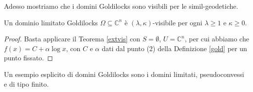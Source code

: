 Adesso mostriamo che i domini Goldilocks sono visibili per le simil-geodetiche.

\begin{cor} \label{gold_is_vis}
    Un dominio limitato Goldilocks $\Omega\subseteq\mathbb{C}^n$ è $(\lambda,\kappa)$-visibile per ogni $\lambda\ge 1$ e $\kappa\ge 0$.
\end{cor}

\begin{proof}
    Basta applicare il Teorema \ref{extvis} con $S=\emptyset$, $U=\mathbb{C}^n$, per cui abbiamo che $f(x)=C+\alpha\log{x}$, con $C$ e $\alpha$ dati dal punto (2) della Definizione \ref{gold} per un punto fissato.
\end{proof}

Un esempio esplicito di domini Goldilocks sono i domini limitati, pseudoconvessi e di tipo finito.
